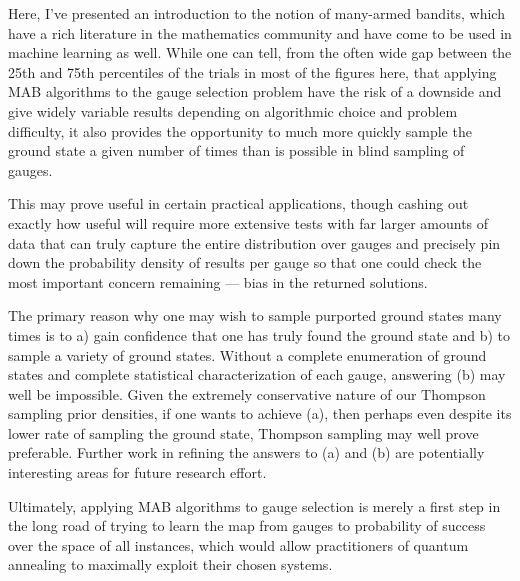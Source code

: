 Here, I've presented an introduction to the notion of many-armed bandits, which have a rich literature in the mathematics community and have come to be used in machine learning as well. While one can tell, from the often wide gap between the 25th and 75th percentiles of the trials in most of the figures here, that applying MAB algorithms to the gauge selection problem have the risk of a downside and give widely variable results depending on algorithmic choice and problem difficulty, it also provides the opportunity to much more quickly sample the ground state a given number of times than is possible in blind sampling of gauges.

This may prove useful in certain practical applications, though cashing out exactly how useful will require more extensive tests with far larger amounts of data that can truly capture the entire distribution over gauges and precisely pin down the probability density of results per gauge so that one could check the most important concern remaining --- bias in the returned solutions.

The primary reason why one may wish to sample purported ground states many times is to a) gain confidence that one has truly found the ground state and b) to sample a variety of ground states. Without a complete enumeration of ground states and complete statistical characterization of each gauge, answering (b) may well be impossible. Given the extremely conservative nature of our Thompson sampling prior densities, if one wants to achieve (a), then perhaps even despite its lower rate of sampling the ground state, Thompson sampling may well prove preferable. Further work in refining the answers to (a) and (b) are potentially interesting areas for future research effort.

Ultimately, applying MAB algorithms to gauge selection is merely a first step in the long road of trying to learn the map from gauges to probability of success over the space of all instances, which would allow practitioners of quantum annealing to maximally exploit their chosen systems.




